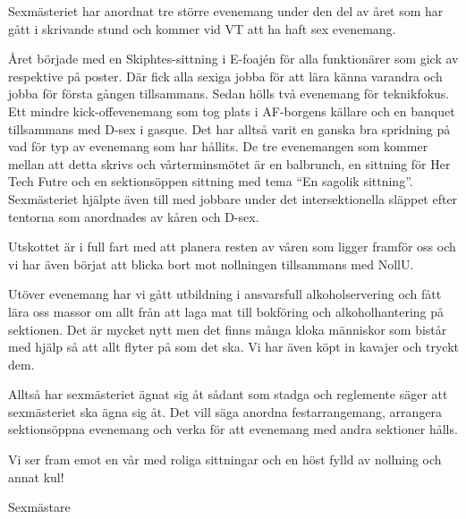 \documentclass[../_main/handlingar.tex]{subfiles}
\begin{document}

Sexmästeriet har anordnat tre större evenemang under den del av året som har gått i skrivande stund och kommer vid VT att ha haft sex evenemang.

Året började med en Skiphtes-sittning i E-foajén för alla funktionärer som gick av respektive på poster. Där fick alla sexiga jobba för att lära känna varandra och jobba för första gången tillsammans. Sedan hölls två evenemang för teknikfokus. Ett mindre kick-offevenemang som tog plats i AF-borgens källare och en banquet tillsammans med D-sex i gasque. Det har alltså varit en ganska bra spridning på vad för typ av evenemang som har hållits. De tre evenemangen som kommer mellan att detta skrivs och vårterminsmötet är en balbrunch, en sittning för Her Tech Futre och en sektionsöppen sittning med tema “En sagolik sittning”.
Sexmästeriet hjälpte även till med jobbare under det intersektionella släppet efter tentorna som anordnades av kåren och D-sex. 

Utskottet är i full fart med att planera resten av våren som ligger framför oss och vi har även börjat att blicka bort mot nollningen tillsammans med NollU.

Utöver evenemang har vi gått utbildning i ansvarsfull alkoholservering och fått lära oss massor om allt från att laga mat till bokföring och alkoholhantering på sektionen. Det är mycket nytt men det finns många kloka människor som bistår med hjälp så att allt flyter på som det ska. Vi har även köpt in kavajer och tryckt dem. 

Alltså har sexmästeriet ägnat sig åt sådant som stadga och reglemente säger att sexmästeriet ska ägna sig åt. Det vill säga anordna festarrangemang, arrangera sektionsöppna evenemang och verka för att evenemang med andra sektioner hålls. 

Vi ser fram emot en vår med roliga sittningar och en höst fylld av nollning och annat kul!

\begin{signatures}{1}
    \mvh
    \signature{\sexm}{Sexmästare}
\end{signatures}
\end{document}
